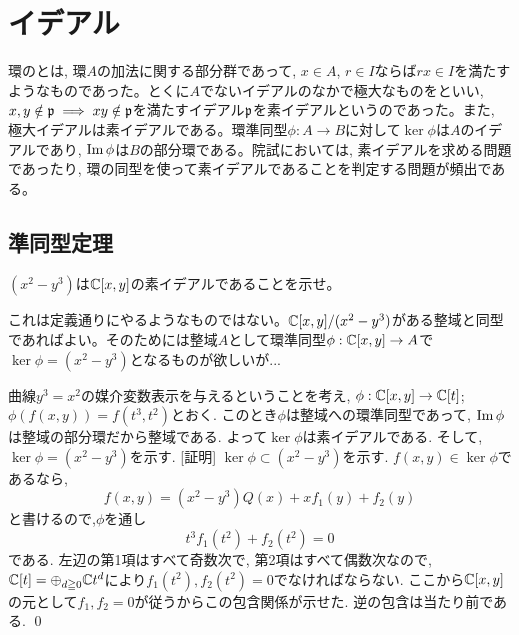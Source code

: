 \section{イデアル}
環のとは, 環$A$の加法に関する部分群であって, $x\in A$, $r\in I$ならば$rx\in I$を満たすようなものであった。とくに$A$でないイデアルのなかで極大なものをといい, $x,y\notin \mathfrak{p}\implies xy\notin\mathfrak{p}$を満たすイデアル$\mathfrak{p}$を素イデアルというのであった。また, 極大イデアルは素イデアルである。環準同型$\phi:A\to B$に対して$\ker{\phi}$は$A$のイデアルであり, $\mathrm{Im}\,\phi$は$B$の部分環である。院試においては, 素イデアルを求める問題であったり, 環の同型を使って素イデアルであることを判定する問題が頻出である。




\subsection{準同型定理}

\begin{egprob}
$(x^2-y^3)$は$\mathbb{C}[x,y]$の素イデアルであることを示せ。
\end{egprob}
\begin{screen}
これは定義通りにやるようなものではない。$\mathbb{C}[x,y]/(x^2-y^3)$がある整域と同型であればよい。そのためには整域$A$として環準同型$\phi:\mathbb{C}[x,y]\to A$で$\ker{\phi}=(x^2-y^3)$となるものが欲しいが...
\end{screen}
\begin{egans}
曲線$y^3=x^2$の媒介変数表示を与えるということを考え, $\phi:\mathbb{C}[x,y] \to \mathbb{C}[t]$; $\phi(f(x,y)) = f(t^3,t^2)$とおく. このとき$\phi$は整域への環準同型であって, $\mathrm{Im}\,\phi$は整域の部分環だから整域である. よって$\ker{\phi}$は素イデアルである. そして, $\ker{\phi} = (x^2-y^3)$を示す. [証明] $\ker{\phi}\subset (x^2-y^3)$を示す. $f(x,y)\in \ker{\phi}$であるなら,
\[f(x,y) = (x^2-y^3)Q(x)  +  xf_1(y) + f_2(y)\]
と書けるので,$\phi$を通し
\[t^3f_1(t^2)+f_2(t^2) = 0\]
である. 左辺の第1項はすべて奇数次で, 第2項はすべて偶数次なので, $\mathbb{C}[t] = \oplus_{d\geqq 0} \mathbb{C}t^d$により$f_1(t^2),f_2(t^2) = 0$でなければならない. ここから$\mathbb{C}[x,y]$の元として$f_1,f_2 = 0$が従うからこの包含関係が示せた. 逆の包含は当たり前である. \qed
\end{egans}




